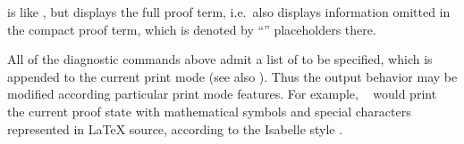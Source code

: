 \begin{isabellebody}
\begin{isamarkuptext}
\begin{descr}
  \item [\hyperlink{command.full-prf}{\mbox{\isa{\isacommand{full{\isacharunderscore}prf}}}}] is like \hyperlink{command.prf}{\mbox{}}, but displays
  the full proof term, i.e.\ also displays information omitted in the
  compact proof term, which is denoted by ``\isa{{\isacharunderscore}}'' placeholders
  there.

  \end{descr}

  All of the diagnostic commands above admit a list of 
  to be specified, which is appended to the current print mode (see
  also \cite{isabelle-ref}).  Thus the output behavior may be modified
  according particular print mode features.  For example, \hyperlink{command.pr}{\mbox{}}~ would print the current
  proof state with mathematical symbols and special characters
  represented in {\LaTeX} source, according to the Isabelle style
  \cite{isabelle-sys}.


\end{isamarkuptext}
\end{isabellebody}
